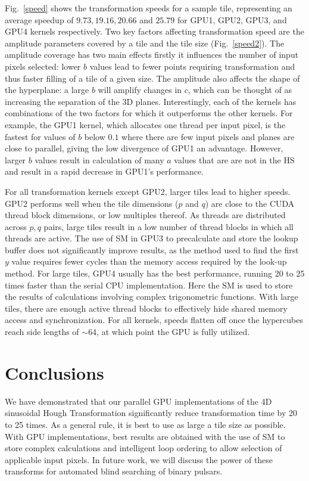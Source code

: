 Fig.~\ref{speed} shows the transformation speeds for a sample tile, representing an average speedup of $9.73, 19.16, 20.66$ and $25.79$ for GPU1, GPU2, GPU3, and GPU4  kernels respectively.
Two key factors affecting transformation speed are the amplitude parameters covered by a tile and the tile size (Fig.~\ref{speed2}).
The amplitude coverage has two main effects firstly it influences the number of input pixels selected: lower $b$ values lead to fewer points requiring transformation and thus faster filling of a tile of a given size.
The amplitude also affects the shape of the hyperplane: a large $b$ will amplify changes in $c$, which can be thought of as increasing the separation of the 3D planes.
Interestingly, each of the kernels has combinations of the two factors for which it outperforms the other kernels.
For example, the GPU1 kernel, which allocates one thread per input pixel, is the fastest for values of $b$ below $0.1$ where there are few input pixels and planes are close to parallel, giving the low divergence of GPU1 an advantage.
However, larger $b$ values result in  calculation of many $a$ values that are are not in the HS and result in a rapid decrease in GPU1's performance.

For all transformation kernels except GPU2, larger tiles lead to higher speeds.
GPU2 performs well when the tile dimensions ($p$ and $q$) are close to the CUDA thread block dimensions, or low multiples thereof.
As threads are distributed across $p,q$ pairs, large tiles result in a low number of thread blocks in which all threads are active.
The use of SM in GPU3 to precalculate and store the lookup buffer does not significantly improve results, as the method used to find the first $y$ value requires fewer cycles than the memory access required by the look-up method.
For large tiles, GPU4 usually has the best performance, running  20 to 25 times faster than the serial CPU implementation.
Here the SM is used to store the results of calculations involving complex trigonometric functions.
With large tiles, there are enough active thread blocks to effectively hide shared memory access and synchronization.
For all kernels, speeds flatten off once the hypercubes reach side lengths of $\sim$64, at which point the GPU is fully utilized.

\section{Conclusions}
\label{Conclusion}

We have demonstrated that our parallel GPU implementations of the 4D sinusoidal Hough Transformation significantly reduce transformation time by 20 to 25 times.
As a general rule, it is best to use as large a tile size as possible.
With GPU implementations, best results are obtained with the use of SM to store complex calculations and intelligent loop ordering to allow selection of applicable input pixels.
In future work, we will discuss the power of these transforms for automated blind searching of binary pulsars.  


